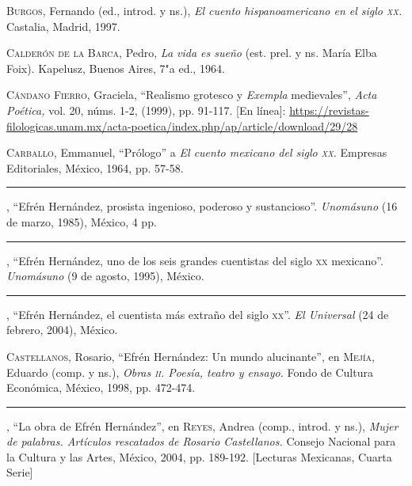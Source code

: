 \documentclass[14pt,twoside,final]{extbook} %
\begin{document}
\textsc{Burgos}, Fernando (ed., introd. y ns.), \emph{El cuento hispanoamericano en el siglo \textsc{xx}.} Castalia, Madrid, 1997.\label{bib:burgos1997}

\textsc{Calderón de la Barca}, Pedro, \emph{La vida es sueño} (est. prel. y ns. María Elba Foix). Kapelusz, Buenos Aires, 7"a ed., 1964.\label{bib:calderon1964}

\textsc{Cándano Fierro}, Graciela, ``Realismo grotesco y \emph{Exempla} medievales'', \emph{Acta Poética,} vol. 20, núms. 1-2, (1999), pp. 91-117. [En línea]: \href{https://revistas-filologicas.unam.mx/acta-poetica/index.php/ap/article/download/29/28}{https://revistas-filologicas.unam.mx/acta-poetica/index.php/ap/article/download/29/28}\label{bib:candano1999}

\textsc{Carballo}, Emmanuel, ``Prólogo'' a \emph{El cuento mexicano del siglo \textsc{xx}.} Empresas Editoriales, México, 1964, pp. 57-58.\label{bib:carballo1964}

\rule{1cm}{0.4pt}, ``Efrén Hernández, prosista ingenioso, poderoso y sustancioso''. \emph{Unomásuno} (16 de marzo, 1985), México, 4 pp.\label{bib:carballo1985}

\rule{1cm}{0.4pt}, ``Efrén Hernández, uno de los seis grandes cuentistas del siglo \textsc{xx} mexicano''. \emph{Unomásuno} (9 de agosto, 1995), México.\label{bib:carballo1995}

\rule{1cm}{0.4pt}, ``Efrén Hernández, el cuentista más extraño del siglo \textsc{xx}''. \emph{El Universal} (24 de febrero, 2004), México.\label{bib:carballo2004}

\textsc{Castellanos}, Rosario, ``Efrén Hernández: Un mundo alucinante'', en \textsc{Mejía}, Eduardo (comp. y ns.), \emph{Obras \textsc{ii}. Poesía, teatro y ensayo.} Fondo de Cultura Económica, México, 1998, pp. 472-474.\label{bib:castellanos1998}

\rule{1cm}{0.4pt}, ``La obra de Efrén Hernández'', en \textsc{Reyes}, Andrea (comp., introd. y ns.), \emph{Mujer de palabras. Artículos rescatados de Rosario Castellanos.} Consejo Nacional para la Cultura y las Artes, México, 2004, pp. \mbox{189-192}. [Lecturas Mexicanas, Cuarta Serie]\label{bib:castellanos2004}
\end{document}
